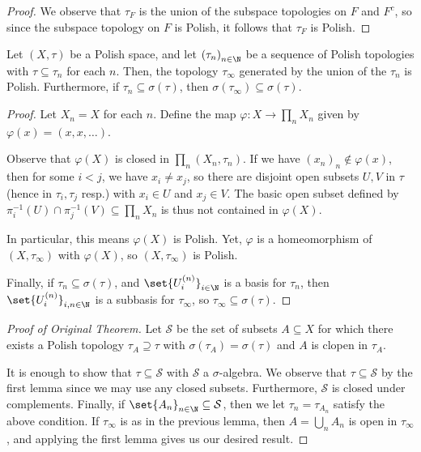 \documentclass[10pt]{mypackage}
\begin{document}
\begin{proof}
  We observe that $\tau_F$ is the union of the subspace topologies on $F$ and $F^{c}$, so since the subspace topology on $F$ is Polish, it follows that $\tau_F$ is Polish.
\end{proof}
\begin{lemma}
  Let $\left( X,\tau \right)$ be a Polish space, and let $\left( \tau_n \right)_{n\in \N}$ be a sequence of Polish topologies with $\tau\subseteq \tau_n$ for each $n$. Then, the topology $\tau_{\infty}$ generated by the union of the $\tau_n$ is Polish. Furthermore, if $\tau_n\subseteq \sigma\left( \tau \right)$, then $\sigma\left( \tau_{\infty} \right)\subseteq \sigma\left( \tau \right)$.
\end{lemma}
\begin{proof}
  Let $X_n = X$ for each $n$. Define the map $\varphi\colon X\rightarrow \prod_{n}X_n$ given by $\varphi(x) = \left( x,x,\dots \right)$.

  Observe that $\varphi(X)$ is closed in $\prod_{n}\left( X_n,\tau_n \right)$. If we have $\left( x_n \right)_n\notin \varphi(x)$, then for some $i < j$, we have $x_i\neq x_j$, so there are disjoint open subsets $U,V$ in $\tau$ (hence in $\tau_i,\tau_j$ resp.) with $x_i\in U$ and $x_j\in V$. The basic open subset defined by $\pi_i^{-1}\left( U \right)\cap \pi_j^{-1}\left( V \right)\subseteq \prod_{n}X_n$ is thus not contained in $\varphi(X)$.

  In particular, this means $\varphi(X)$ is Polish. Yet, $\varphi$ is a homeomorphism of $\left( X,\tau_{\infty} \right)$ with $\varphi(X)$, so $\left( X,\tau_{\infty} \right)$ is Polish.

  Finally, if $\tau_n\subseteq \sigma\left( \tau \right)$, and $\set{U_i^{(n)}}_{i\in \N}$ is a basis for $\tau_n$, then $\set{U_i^{(n)}}_{i,n\in \N}$ is a subbasis for $\tau_{\infty}$, so $\tau_{\infty}\subseteq \sigma\left( \tau \right)$.
\end{proof}
\begin{proof}[Proof of Original Theorem]
  Let $\mathcal{S}$ be the set of subsets $A\subseteq X$ for which there exists a Polish topology $\tau_A\supseteq \tau$ with $\sigma\left( \tau_A \right) = \sigma\left( \tau \right)$ and $A$ is clopen in $\tau_A$.

  It is enough to show that $\tau\subseteq \mathcal{S}$ with $\mathcal{S}$ a $\sigma$-algebra. We observe that $\tau\subseteq \mathcal{S}$ by the first lemma since we may use any closed subsets. Furthermore, $\mathcal{S}$ is closed under complements. Finally, if $\set{A_n}_{n\in \N}\subseteq \mathcal{S}$, then we let $\tau_n = \tau_{A_n}$ satisfy the above condition. If $\tau_{\infty}$ is as in the previous lemma, then $A = \bigcup_{n}A_n$ is open in $\tau_{\infty}$, and applying the first lemma gives us our desired result.
\end{proof}
\end{document}
